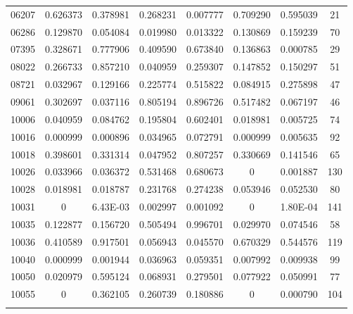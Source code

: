 \begin{table}[H]
{\begin{tabular}{cccccccc}
06207 & 0.626373 & 0.378981 & 0.268231 & {\color{red}0.007777} & 0.709290 & 0.595039 & 21 \\
06286 & 0.129870 & 0.054084 & {\color{red}0.019980} & {\color{red}0.013322} & 0.130869 & 0.159239 & 70 \\
07395 & 0.328671 & 0.777906 & 0.409590 & 0.673840 & 0.136863 & {\color{red}0.000785} & 29 \\
08022 & 0.266733 & 0.857210 & {\color{red}0.040959} & 0.259307 & 0.147852 & 0.150297 & 51 \\
08721 & {\color{red}0.032967} & 0.129166 & 0.225774 & 0.515822 & 0.084915 & 0.275898 & 47 \\
09061 & 0.302697 & {\color{red}0.037116} & 0.805194 & 0.896726 & 0.517482 & 0.067197 & 46 \\
10006 & {\color{red}0.040959} & 0.084762 & 0.195804 & 0.602401 & {\color{red}0.018981} & {\color{red}0.005725} & 74 \\
10016 & {\color{red}0.000999} & {\color{red}0.000896} & {\color{red}0.034965} & 0.072791 & {\color{red}0.000999} & {\color{red}0.005635} & 92 \\
10018 & 0.398601 & 0.331314 & {\color{red}0.047952} & 0.807257 & 0.330669 & 0.141546 & 65 \\
10026 & {\color{red}0.033966} & {\color{red}0.036372} & 0.531468 & 0.680673 & {\color{red}0}        & {\color{red}0.001887} & 130 \\
10028 & {\color{red}0.018981} & {\color{red}0.018787} & 0.231768 & 0.274238 & 0.053946 & 0.052530 & 80 \\
10031 & {\color{red}0}        & {\color{red}6.43E-03} & {\color{red}0.002997} & {\color{red}0.001092} & {\color{red}0}        & {\color{red}1.80E-04} & 141 \\
10035 & 0.122877 & 0.156720 & 0.505494 & 0.996701 & {\color{red}0.029970} & 0.074546 & 58 \\
10036 & 0.410589 & 0.917501 & 0.056943 & {\color{red}0.045570} & 0.670329 & 0.544576 & 119 \\
10040 & {\color{red}0.000999} & {\color{red}0.001944} & {\color{red}0.036963} & 0.059351 & {\color{red}0.007992} & {\color{red}0.009938} & 99 \\
10050 & {\color{red}0.020979} & 0.595124 & 0.068931 & 0.279501 & 0.077922 & 0.050991 & 77 \\
10055 & {\color{red}0}        & 0.362105 & 0.260739 & 0.180886 & {\color{red}0}        & {\color{red}0.000790} & 104 \\ \hline

\label{tab:nosocsII}
\end{tabular}
}
\end{table}

